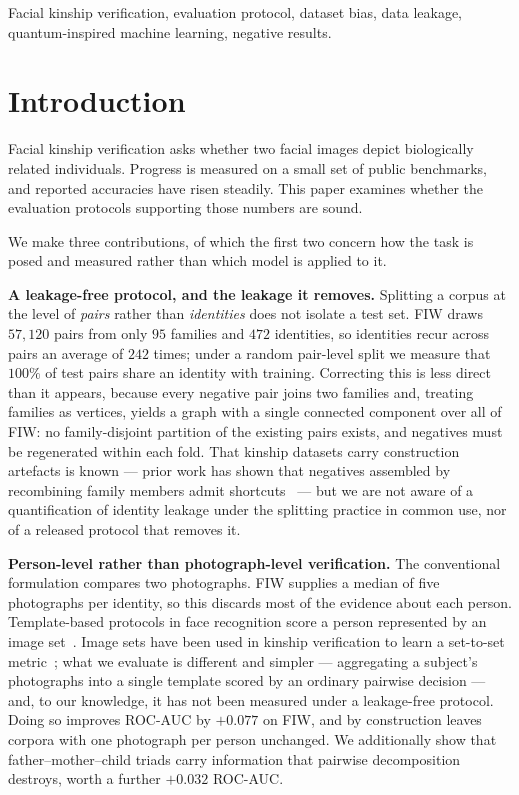 \documentclass[journal,12pt]{IEEEtran}
\begin{document}
\begin{IEEEkeywords}
Facial kinship verification, evaluation protocol, dataset bias, data leakage,
quantum-inspired machine learning, negative results.
\end{IEEEkeywords}

\section{Introduction}

Facial kinship verification asks whether two facial images depict biologically
related individuals. Progress is measured on a small set of public benchmarks,
and reported accuracies have risen steadily. This paper examines whether the
evaluation protocols supporting those numbers are sound.

We make three contributions, of which the first two concern how the task is
posed and measured rather than which model is applied to it.

\textbf{A leakage-free protocol, and the leakage it removes.} Splitting a
corpus at the level of \emph{pairs} rather than \emph{identities} does not
isolate a test set. FIW draws $57{,}120$ pairs from only $95$ families and
$472$ identities, so identities recur across pairs an average of $242$ times;
under a random pair-level split we measure that $100\%$ of test pairs share an
identity with training. Correcting this is less direct than it appears, because
every negative pair joins two families and, treating families as vertices,
yields a graph with a single connected component over all of FIW: no
family-disjoint partition of the existing pairs exists, and negatives must be
regenerated within each fold. That kinship datasets carry construction
artefacts is known --- prior work has shown that negatives assembled by
recombining family members admit shortcuts~\cite{dawson2018samephoto} --- but we are
not aware of a quantification of identity leakage under the splitting practice
in common use, nor of a released protocol that removes it.

\textbf{Person-level rather than photograph-level verification.} The
conventional formulation compares two photographs. FIW supplies a median of
five photographs per identity, so this discards most of the evidence about each
person. Template-based protocols in face recognition score a person represented
by an image set~\cite{whitelam2017ijbb}. Image sets have been used in kinship
verification to learn a set-to-set metric~\cite{kohli2019imageset}; what we
evaluate is different and simpler --- aggregating a subject's photographs into
a single template scored by an ordinary pairwise decision --- and, to our
knowledge, it has not been measured under a leakage-free protocol. Doing so
improves ROC-AUC by $+0.077$ on FIW, and by construction leaves corpora with
one photograph per person unchanged.
We additionally show that father--mother--child triads carry information that
pairwise decomposition destroys, worth a further $+0.032$ ROC-AUC.
\end{document}

